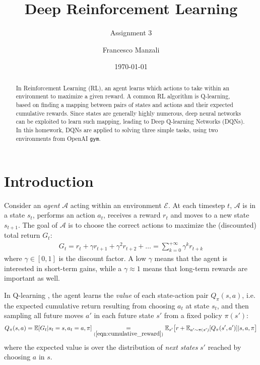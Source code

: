 \documentclass[11pt,a4paper]{scrartcl}
\newcommand{\exerciseNumber}{3}
\begin{document}
\title{Deep Reinforcement Learning}
\subtitle{Assignment \exerciseNumber}
\author{\large Francesco Manzali}
\date{\large \today}
\maketitle
\thispagestyle{fancy}

\begin{abstract}
  In Reinforcement Learning (RL), an agent learns which actions to take within an environment to maximize a given reward. A common RL algorithm is Q-learning, based on finding a mapping between pairs of states and actions and their expected cumulative rewards. Since states are generally highly numerous, deep neural networks can be exploited to learn such mapping, leading to Deep Q-learning Networks (DQNs). In this homework, DQNs are applied to solving three simple tasks, using two environments from OpenAI \texttt{gym}. 
\end{abstract}


\section*{Introduction}
Consider an \textit{agent} $\mathcal{A}$ acting within an environment $\mathcal{E}$. At each timestep $t$, $\mathcal{A}$ is in a state $s_t$, performs an action $a_t$, receives a reward $r_t$ and moves to a new state $s_{t+1}$.
The goal of $\mathcal{A}$ is to choose the correct actions to maximize the (discounted) total return $G_t$:
\begin{align}\label{eqn:cumulative_reward}
    G_t = r_t + \gamma r_{t+1} + \gamma^2 r_{t+2} + \dots = \sum_{k=0}^{+\infty} \gamma^k r_{t+k}
\end{align}
where $\gamma \in [0,1]$ is the discount factor. A low $\gamma$ means that the agent is interested in short-term gains, while a $\gamma \approx 1$ means that long-term rewards are important as well.

\medskip

In Q-learning \cite{dueling_networks}, the agent learns the \textit{value} of each state-action pair $Q_\pi(s,a)$, i.e. the expected cumulative return resulting from choosing $a_t$ at state $s_t$, and then sampling all future moves $a'$ in each future state $s'$ from a fixed policy $\pi(s'):$
\begin{align}\label{eqn:q_value}
    Q_\pi(s, a) = \mathbb{E}[G_t | s_t=s, a_t=a, \pi] \underset{(\ref{eqn:cumulative_reward})}{=} \mathbb{E}_{s'} \big[r + \mathbb{E}_{a' \sim \pi(s')} [Q_\pi(s', a')] | s, a, \pi\big] 
\end{align}
where the expected value is over the distribution of \textit{next states} $s'$ reached by choosing $a$ in $s$.
\end{document}

